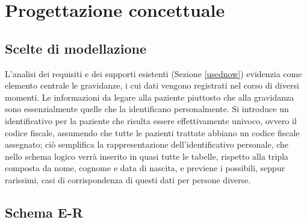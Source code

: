 \chapter{Progettazione concettuale}

\section{Scelte di modellazione}

L'analisi dei requisiti e dei supporti esistenti (Sezione \ref{usednow}) evidenzia come elemento centrale le gravidanze, i cui dati vengono registrati nel corso di diversi momenti.
Le informazioni da legare alla paziente piuttosto che alla gravidanza sono essenzialmente quelle che la identificano personalmente.
Si introduce un identificativo per la paziente che risulta essere effettivamente univoco, ovvero il codice fiscale, assumendo che tutte le pazienti trattate abbiano un codice fiscale assegnato; ciò semplifica la rappresentazione dell'identificativo personale, che nello schema logico verrà inserito in quasi tutte le tabelle, rispetto alla tripla composta da nome, cognome e data di nascita, e previene i possibili, seppur rarissimi, casi di corrispondenza di questi dati per persone diverse.

\section{Schema E-R}